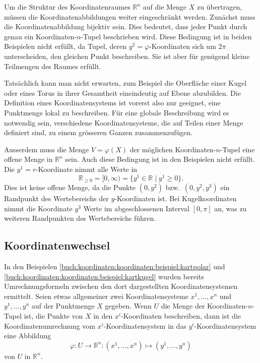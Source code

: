 Um die Struktur des Koordinatenraumes $\mathbb{R}^n$ auf die Menge
$X$ zu übertragen, müssen die Koordinatenabbildungen weiter eingeschränkt
werden.
Zunächst muss die Koordinatenabbildung bijektiv sein.
Dies bedeutet, dass jeder Punkt durch genau ein Koordinaten-$n$-Tupel
beschrieben wird.
Diese Bedingung ist in beiden Beispielen nicht erfüllt, da Tupel,
deren $y^2=\varphi$-Koordinaten sich um $2\pi$ unterscheiden, den
gleichen Punkt beschreiben.
Sie ist aber für genügend kleine Teilmengen des Raumes erfüllt.

Tatsächlich kann man nicht erwarten, zum Beispiel die Oberfläche einer
Kugel oder eines Torus in ihrer Gesamtheit eineindeutig auf Ebene
abzubilden.
Die Definition eines Koordinatensystems ist vorerst also nur geeignet,
eine Punktmenge lokal zu beschreiben.
Für eine globale Beschreibung wird es notwendig sein, verschiedene
Koordinatensysteme, die auf Teilen einer Menge definiert sind, zu
einem grösseren Ganzen zusammenzufügen.

Ausserdem muss die Menge $V=\varphi(X)$ der möglichen Koordinaten-$n$-Tupel
eine offene Menge in $\mathbb{R}^n$ sein.
Auch diese Bedingung ist in den Beispielen nicht erfüllt.
Die $y^1=r$-Koordinate nimmt alle Werte in
\[
\mathbb{R}_{\ge 0}
=
[0,\infty)
=
\{
y^1\in\mathbb{R}
\mid
y^1\ge 0
\}.
\]
Dies ist keine offene Menge, da die Punkte $(0,y^2)$ bzw.~$(0,y^2,y^3)$
ein Randpunkt des Wertebereichs der $y$-Koordinaten ist.
Bei Kugelkoordinaten nimmt die Koordinate $y^3$ Werte im
abgeschlossenen Interval $[0,\pi]$ an, was zu weiteren Randpunkten
des Wertebereichs führen.


\subsection{Koordinatenwechsel}
In den Beispielen
\ref{buch:koordinaten:koordinaten:beispiel:kartpolar}
und
\ref{buch:koordinaten:koordinaten:beispiel:kartkugel}
wurden bereits Umrechnungsformeln zwischen den dort dargestellten
Koordinatensystemen ermittelt.
Seien etwas allgemeiner zwei Koordinatensysteme $x^1,\dots,x^n$
und $y^1,\dots,y^n$ auf der Punktmenge $X$ gegeben.
Wenn $U$ die Menge der Koordinaten-$n$-Tupel ist, die Punkte von $X$
in den $x^i$-Koordinaten beschreiben, dann ist die Koordinatenumrechnung
vom $x^i$-Koordinatensystem in das $y^i$-Koordinatensystem eine Abbildung
\[
\varphi
\colon
U\to\mathbb{R}^n
:
(x^1,\dots,x^n)
\mapsto
(y^1,\dots,y^n)
\]
von $U$ in $\mathbb{R}^n$.


